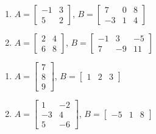 \documentclass{ximera}
\begin{document}
\begin{multicols}{2} 
\begin{enumerate}
\setcounter{enumi}{\value{HW}}

\item  $A = \left[ \begin{array}{rr} -1 & 3 \\ 5 & 2 \end{array} \right]$, $B=\left[ \begin{array}{rrr} 7 & 0 & 8 \\ -3 & 1 & 4 \end{array} \right]$

\item  $A = \left[ \begin{array}{rr} 2 & 4 \\ 6 & 8 \end{array} \right]$, $B=\left[ \begin{array}{rrr} -1 & 3 & -5 \\ 7 & -9 & 11 \end{array} \right]$

\setcounter{HW}{\value{enumi}}
\end{enumerate}
\end{multicols}

\begin{multicols}{2} 
\begin{enumerate}
\setcounter{enumi}{\value{HW}}



\item  $A = \left[ \begin{array}{r} 7 \\ 8 \\ 9 \end{array} \right]$, $B=\left[ \begin{array}{rrr} 1 & 2 & 3 \end{array} \right]$

\item  $A = \left[ \begin{array}{rr} 1 & -2 \\ -3 & 4 \\ 5 & -6 \end{array} \right]$, $B=\left[ \begin{array}{rrr} -5 & 1 & 8 \end{array} \right]$


\setcounter{HW}{\value{enumi}}
\end{enumerate}
\end{multicols}
\end{document}
